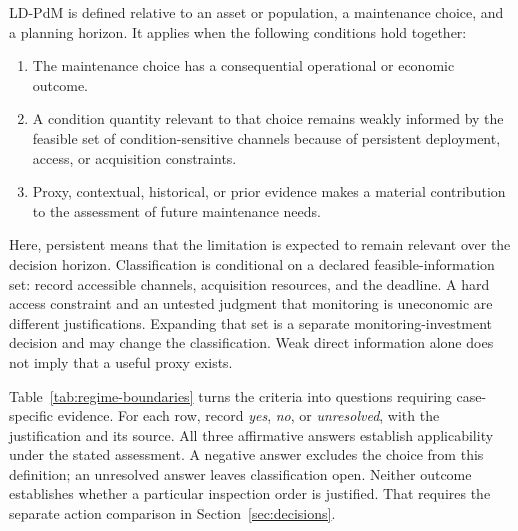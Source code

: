 \documentclass[symmetry,article,submit,pdftex,oneauthor]{Definitions/mdpi}
\begin{document}
LD-PdM is defined relative to an asset or population, a maintenance choice, and a planning horizon. It applies when the following conditions hold together:
\begin{enumerate}[label=(\arabic*),leftmargin=1.5em]
\item The maintenance choice has a consequential operational or economic outcome.
\item A condition quantity relevant to that choice remains weakly informed by the feasible set of condition-sensitive channels because of persistent deployment, access, or acquisition constraints.
\item Proxy, contextual, historical, or prior evidence makes a material contribution to the assessment of future maintenance needs.
\end{enumerate}
Here, persistent means that the limitation is expected to remain relevant over the decision horizon. Classification is conditional on a declared feasible-information set: record accessible channels, acquisition resources, and the deadline. A hard access constraint and an untested judgment that monitoring is uneconomic are different justifications. Expanding that set is a separate monitoring-investment decision and may change the classification. Weak direct information alone does not imply that a useful proxy exists.

Table~\ref{tab:regime-boundaries} turns the criteria into questions requiring case-specific evidence. For each row, record \emph{yes}, \emph{no}, or \emph{unresolved}, with the justification and its source. All three affirmative answers establish applicability under the stated assessment. A negative answer excludes the choice from this definition; an unresolved answer leaves classification open. Neither outcome establishes whether a particular inspection order is justified. That requires the separate action comparison in Section~\ref{sec:decisions}.
\end{document}
